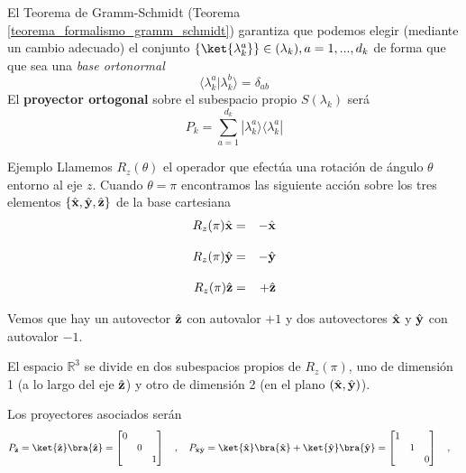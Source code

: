 \documentclass[a4paper,11pt]{book} %
\numberwithin{equation}{chapter}
\newcommand{\braket}[2]{\langle #1|#2\rangle}
\newcommand{\ketbra}[2]{| #1\rangle \! \langle #2|}
\begin{document}
El Teorema de Gramm-Schmidt (Teorema \ref{teorema_formalismo_gramm_schmidt}) garantiza que podemos elegir (mediante un cambio adecuado) el conjunto $\{\ket{\lambda_{k}^a}\}\in (\lambda_k), a=1,...,d_k$ de forma que que sea una  \textit{base ortonormal}
\begin{equation}
\braket{\lambda_{k}^a}{\lambda_{k}^b}=\delta_{ab}
\end{equation}
El \textbf{proyector ortogonal} sobre el subespacio propio $S(\lambda_k)$ será
	\begin{equation} \label{ec_formalismo_proyec_subespacio_propio}
	\boxed{P_k = \sum_{a=1}^{d_k} \ketbra{\lambda_{k}^a}{\lambda_{k}^a}}
	\end{equation}

\begin{mybox_green}{Ejemplo}
Llamemos $R_z(\theta)$ el operador que efectúa una rotación  de ángulo $\theta$ entorno al eje $z$. Cuando $\theta = \pi$ encontramos las siguiente acción sobre los tres elementos $\{\hat{\bf x},\hat{\bf y},\hat{\bf z}\}$
de la base cartesiana
\begin{eqnarray*}
R_z(\pi)\hat{\bf x} &=&-\hat{\bf x}  \\ \rule{0mm}{6mm}
R_z(\pi)\hat{\bf y} &=& -\hat{\bf y}  \\ \rule{0mm}{6mm}
R_z(\pi)\hat{\bf z} &=& + \hat{\bf z}  
\end{eqnarray*}    
\vspace{0.3cm}

Vemos que hay un autovector $\hat{\bf z}$ con autovalor $+1$ y dos autovectores $\hat{\bf x} $ y $\hat{\bf y} $
con autovalor $-1$.
\vspace{0.3cm}

El espacio ${\mathbb R}^3$ se divide en dos subespacios propios de $R_z(\pi)$, uno de dimensión 1 (a lo largo del eje $\hat{\bf z}$) y otro de dimensión 2 (en el plano $(\hat{\bf x},\hat{\bf y})$).
\vspace{0.3cm}

Los proyectores asociados serán
    \begin{equation}
P_{\hat{\bf z}}= \ket{\hat{\bf z}}\bra{\hat{\bf z}}=\begin{bmatrix} 0 & & \\ & 0 & \\ & & 1 \end{bmatrix}~~~,~~~
P_{\hat{\bf x}\hat{\bf y}}= \ket{\hat{\bf x}}\bra{\hat{\bf x}}+\ket{\hat{\bf y}}\bra{\hat{\bf y}}=\begin{bmatrix} 1 & & \\ & 1 & \\ & & 0 \end{bmatrix}~~~,~~~
\end{equation}
\end{mybox_green}
\end{document}
